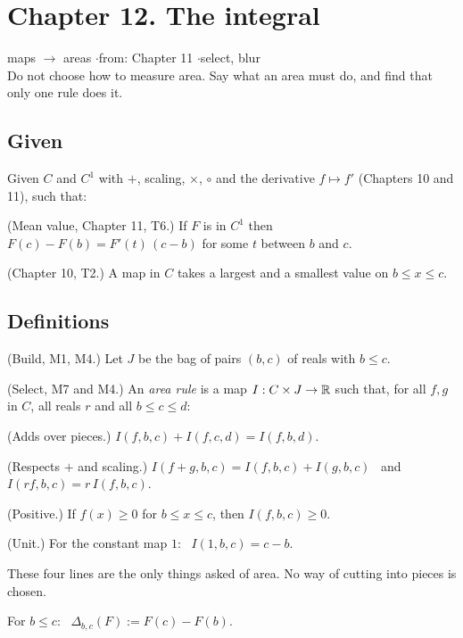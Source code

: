 \newpage

\section*{Chapter 12. The integral}
\begin{center}
{\normalsize maps $\to$ areas \quad$\cdot$\quad from: Chapter 11 \quad$\cdot$\quad select, blur}\\[4pt]
{\small Do not choose how to measure area. Say what an area must do, and find that only one rule does it.}
\end{center}

\subsection*{Given}

Given $C$ and $C^1$ with $+$, scaling, $\times$, $\circ$ and the derivative $f \mapsto f'$ (Chapters 10 and 11), such that:
\begin{lines}
\item[\lab{G1}] (Mean value, Chapter 11, T6.) If $F$ is in $C^1$ then $F(c) - F(b) = F'(t)\,(c - b)$ for some $t$ between $b$ and $c$.
\item[\lab{G2}] (Chapter 10, T2.) A map in $C$ takes a largest and a smallest value on $b \le x \le c$.
\end{lines}

\subsection*{Definitions}

\begin{lines}
\item[\lab{D1}] (Build, M1, M4.) Let $J$ be the bag of pairs $(b, c)$ of reals with $b \le c$.
\item[\lab{D2}] (Select, M7 and M4.) An \emph{area rule} is a map $I : C \times J \to \mathbb{R}$ such that, for all $f, g$ in $C$, all reals $r$ and all $b \le c \le d$:
\begin{lines}
\item[\lab{A1}] (Adds over pieces.) $I(f, b, c) + I(f, c, d) = I(f, b, d)$.
\item[\lab{A2}] (Respects $+$ and scaling.) $I(f + g, b, c) = I(f, b, c) + I(g, b, c)$ \ and \ $I(r f, b, c) = r\, I(f, b, c)$.
\item[\lab{A3}] (Positive.) If $f(x) \ge 0$ for $b \le x \le c$, then $I(f, b, c) \ge 0$.
\item[\lab{A4}] (Unit.) For the constant map $1$: \ $I(1, b, c) = c - b$.
\end{lines}
These four lines are the only things asked of area. No way of cutting into pieces is chosen.
\item[\lab{D3}] For $b \le c$: \ $\Delta_{b,c}(F) := F(c) - F(b)$.
\end{lines}

